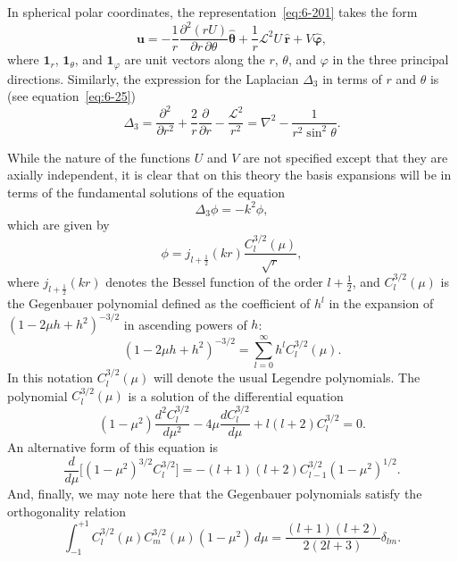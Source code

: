 In spherical polar coordinates, the representation~\eqref{eq:6-201} takes the
form
\begin{equation}\label{eq:6-208}
\boldsymbol{u} = -\frac{1}{r}\frac{\partial^2(rU)}{\partial r\,\partial\theta}\hat{\boldsymbol{\theta}} + \frac{1}{r}\mathscr{L}^2 U\,\hat{\boldsymbol{r}} + V\hat{\boldsymbol{\varphi}},
\end{equation}
where $\mathbf{1}_r$, $\mathbf{1}_\theta$, and $\mathbf{1}_\varphi$ are unit vectors along the $r$, $\theta$, and $\varphi$
in the three principal directions. Similarly, the expression for the
Laplacian $\Delta_3$ in terms of $r$ and $\theta$ is (see equation~\eqref{eq:6-25})
\begin{equation}\label{eq:6-209}
\Delta_3 = \frac{\partial^2}{\partial r^2} + \frac{2}{r}\frac{\partial}{\partial r} - \frac{\mathscr{L}^2}{r^2} = \nabla^2 - \frac{1}{r^2\sin^2\theta}.
\end{equation}

While the nature of the functions $U$ and $V$ are not specified except
that they are axially independent, it is clear that on this theory the
basis expansions will be in terms of the fundamental solutions of the
equation
\begin{equation}\label{eq:6-210}
\Delta_3\phi = -k^2\phi,
\end{equation}
which are given by
\begin{equation}\label{eq:6-211}
\phi = j_{l+\frac{1}{2}}(kr)\frac{C_l^{3/2}(\mu)}{\sqrt{r}},
\end{equation}
where $j_{l+\frac{1}{2}}(kr)$ denotes the Bessel function of the order $l+\frac{1}{2}$, and
$C_l^{3/2}(\mu)$ is the Gegenbauer polynomial defined as the coefficient of $h^l$ in
the expansion of $(1-2\mu h+h^2)^{-3/2}$ in ascending powers of $h$:
\begin{equation}\label{eq:6-212}
(1-2\mu h+h^2)^{-3/2} = \sum_{l=0}^{\infty} h^l C_l^{3/2}(\mu).
\end{equation}
In this notation $C_l^{3/2}(\mu)$ will denote the usual Legendre polynomials.
The polynomial $C_l^{3/2}(\mu)$ is a solution of the differential equation
\begin{equation}\label{eq:6-213}
(1-\mu^2)\frac{d^2 C_l^{3/2}}{d\mu^2} - 4\mu\frac{dC_l^{3/2}}{d\mu} + l(l+2)C_l^{3/2} = 0.
\end{equation}
An alternative form of this equation is
\begin{equation}\label{eq:6-214}
\frac{d}{d\mu}\bigl[(1-\mu^2)^{3/2}C_l^{3/2}\bigr] = -(l+1)(l+2)C_{l-1}^{3/2}(1-\mu^2)^{1/2}.
\end{equation}
And, finally, we may note here that the Gegenbauer polynomials satisfy
the orthogonality relation
\begin{equation}\label{eq:6-215}
\int_{-1}^{+1} C_l^{3/2}(\mu)C_m^{3/2}(\mu)(1-\mu^2)\,d\mu = \frac{(l+1)(l+2)}{2(2l+3)}\delta_{lm}.
\end{equation}


